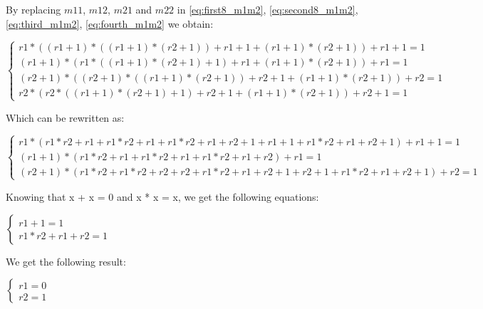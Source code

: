 By replacing $m11$, $m12$, $m21$  and $m22$ in \ref{eq:first8_m1m2},  \ref{eq:second8_m1m2}, \ref{eq:third_m1m2}, \ref{eq:fourth_m1m2} we obtain:

\begin{center}
\begin{math}
\begin{cases}
  r1 * ((r1 + 1) * ((r1 + 1) * (r2 + 1)) + r1 + 1 + (r1 + 1) * (r2 + 1)) + r1 + 1 = 1\\
 (r1 + 1) * (r1 * ((r1 + 1) * (r2 + 1) + 1) + r1 + (r1 + 1) * (r2 + 1)) + r1 = 1\\
 (r2 + 1) * ((r2 + 1) * ((r1 + 1) * (r2 + 1)) + r2 + 1 + (r1 + 1) * (r2 + 1)) + r2 = 1\\
 r2 * (r2 * ((r1 + 1) * (r2 + 1) + 1) + r2 + 1 + (r1 + 1) * (r2 + 1)) + r2 + 1 = 1
\end{cases}
\end{math} 
\end{center}

Which can be rewritten as: 

\begin{center}
\begin{math}
\begin{cases}
r1 * ( r1 * r2 + r1 + r1 * r2 + r1 + r1 * r2 + r1 + r2 + 1 + r1 + 1 + r1 * r2 + r1 + r2 + 1) + r1 + 1 = 1\\
(r1 + 1) * (r1 * r2 + r1 + r1 * r2 + r1 + r1 * r2 + r1 + r2) + r1 = 1\\
(r2 + 1) * (r1 * r2 + r1 * r2 + r2 + r2 +r1 * r2 + r1 + r2 + 1 + r2 + 1 + r1 * r2 + r1 +  r2 + 1) + r2 = 1
\end{cases}
\end{math} 
\end{center}


Knowing that x + x = 0 and x * x = x, we get the following equations:

\begin{center}
\begin{math}
\begin{cases}
  r1 + 1 = 1\\
 r1 * r2 + r1 + r2 = 1
\end{cases}
\end{math} 
\end{center}

We get the following result: 

\begin{center}
\begin{math}
\begin{cases}
 r1 = 0\\
 r2 = 1
\end{cases}
\end{math} 
\end{center}



